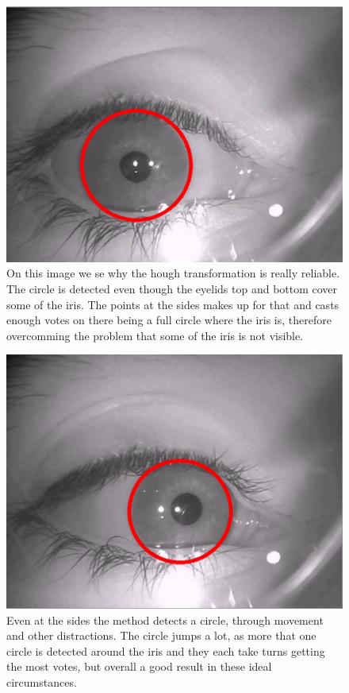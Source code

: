 \begin{figure}[htbp]
\centering
\includegraphics{pics/hough/8.png}
\caption{On this image we se why the hough transformation is really
reliable. The circle is detected even though the eyelids top and bottom
cover some of the iris. The points at the sides makes up for that and
casts enough votes on there being a full circle where the iris is,
therefore overcomming the problem that some of the iris is not visible.
\label{hough8}}
\end{figure}

\begin{figure}[htbp]
\centering
\includegraphics{pics/hough/9.png}
\caption{Even at the sides the method detects a circle, through movement
and other distractions. The circle jumps a lot, as more that one circle
is detected around the iris and they each take turns getting the most
votes, but overall a good result in these ideal circumstances.
\label{hough9}}
\end{figure}

